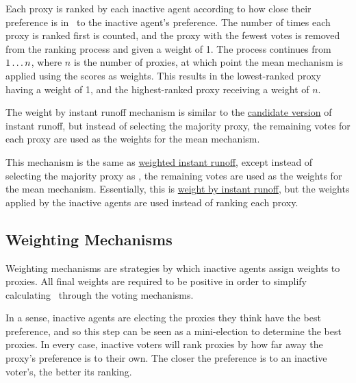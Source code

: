 \label{para:avg-ranked-choice}
Each proxy is ranked by each inactive agent according to how close their preference
is in \systemspace\ to the inactive agent's preference.
The number of times each proxy is ranked first is counted, and the proxy with
the fewest votes is removed from the ranking process and given a weight of 1.
The process continues from $1 \mathellipsis n$, where $n$ is the number of
proxies, at which point the mean mechanism is applied using the scores as
weights.
This results in the lowest-ranked proxy having a weight of 1, and the
highest-ranked proxy receiving a weight of $n$.

\label{para:avg-instant-runoff}
The weight by instant runoff mechanism is similar to the
\hyperref[para:cand-instant-runoff]{candidate version} of instant
runoff, but instead of selecting the majority proxy, the remaining votes for
each proxy are used as the weights for the mean mechanism.

\label{para:avg-weighted-instant-runoff}
This mechanism is the same as
\hyperref[para:candidate-weighted-instant-runoff]{weighted instant runoff},
except instead of selecting the majority proxy as \systemtruth, the remaining votes
are used as the weights for the mean mechanism.
Essentially, this is
\hyperref[para:avg-instant-runoff]{weight by instant runoff}, but the weights
applied by the inactive agents are used instead of ranking each proxy.

\subsection{Weighting Mechanisms}\label{subsec:weighting-mechanisms}
Weighting mechanisms are strategies by which inactive agents assign weights
to proxies.
All final weights are required to be positive in order to simplify
calculating \systemtruth\ through the voting mechanisms.

In a sense, inactive agents are electing the proxies they think have the best
preference, and so this step can be seen as a mini-election to determine the best
proxies.
In every case, inactive voters will rank proxies by how far away the proxy's
preference is to their own.
The closer the preference is to an inactive voter's, the better its ranking.

